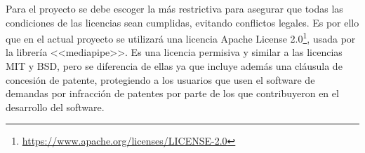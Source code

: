 Para el proyecto se debe escoger la más restrictiva para asegurar que todas las condiciones de las licencias sean cumplidas, evitando conflictos legales. Es por ello que en el actual proyecto se utilizará una licencia Apache License 2.0\footnote{\url{https://www.apache.org/licenses/LICENSE-2.0}}, usada por la librería <<mediapipe>>. 
Es una licencia permisiva y similar a las licencias MIT y BSD, pero se diferencia de ellas ya que incluye además una cláusula de concesión de patente, protegiendo a los usuarios que usen el software de demandas por infracción de patentes por parte de los que contribuyeron en el desarrollo del software.